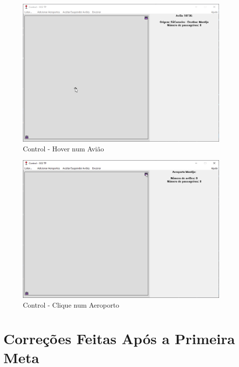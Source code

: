 \documentclass[11pt]{article}
\begin{document}
	\begin{figure}[h]
		\includegraphics[width=0.95\textwidth,height=0.88\textheight,keepaspectratio]{control-airplane}
		\centering
		\caption{Control - Hover num Avião}
		\label{fig:control-airplane}
	\end{figure}
	
	\begin{figure}[H]
		\includegraphics[width=0.95\textwidth,height=0.88\textheight,keepaspectratio]{control-airport}
		\centering
		\caption{Control - Clique num Aeroporto}
		\label{fig:control-airport}
	\end{figure}
    
    
	\large
	\section{Correções Feitas Após a Primeira Meta}
	\normalsize
	
\end{document}

